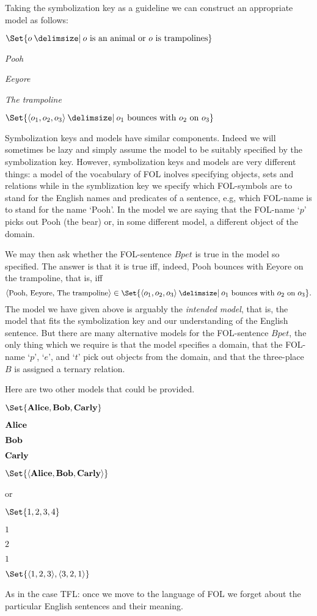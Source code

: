 Taking the symbolization key as a guideline we can construct an appropriate model as follows:
\begin{interp}
\item[\domain]$\Set{o \given o\text{ is an animal or }o\text{ is trampolines}}$
\item[\denote{p}]\emph{Pooh}
\item[\denote{e}]\emph{Eeyore}
\item[\denote{t}]\emph{The trampoline}
\item[\denote{B}]$\Set{\langle o_1,o_2,o_3\rangle \given o_1\text{ bounces with }o_2\text{ on }o_3}$
\end{interp}
Symbolization keys and models have similar components. Indeed we will sometimes be lazy and simply assume the model to be suitably specified by the symbolization key. However, symbolization keys and models are very different things: a model of the vocabulary of FOL inolves specifying objects, sets and relations while in the symblization key we specify which FOL-symbols are to stand for the English names and predicates of a sentence, e.g, which FOL-name is to stand for the name `Pooh'. In the model we are saying that the FOL-name `$p$' picks out Pooh (the bear) or, in some different model, a different object of the domain. 

We may then ask whether the FOL-sentence $Bpet$ is true in the model so specified. The answer is that it is true iff, indeed, Pooh bounces with Eeyore on the trampoline, that is, iff
$${\small \langle \text{Pooh, Eeyore, The trampoline}\rangle\in\Set{\langle o_1,o_2,o_3\rangle \given o_1\text{ bounces with }o_2\text{ on }o_3}.}$$
The model we have given above is arguably the \emph{intended model}, that is, the model that fits the symbolization key and our understanding of the English sentence. But there are many alternative models for the FOL-sentence $Bpet$, the only thing which we require is that the model specifies a domain, that the FOL-name `$p$', `$e$', and `$t$' pick out objects from the domain, and that the three-place $B$ is assigned a ternary relation. 

Here are two other models that could be provided.
\begin{interp}
	\item[\domain]$\Set{\emph{Alice},\emph{Bob}, \emph{Carly}}$
	\item[\denote{p}]$\emph{Alice}$
	\item[\denote{e}]$\emph{Bob}$
	\item[\denote{t}]$\emph{Carly}$
	\item[\denote{B}]$\Set{\sequence{\emph{Alice},\emph{Bob},\emph{Carly}}}$
\end{interp}
or
\begin{interp}
	\item[\domain]$\Set{1,2,3,4}$
	\item[\denote{p}]$1$
	\item[\denote{e}]$2$
	\item[\denote{t}]$1$
	\item[\denote{B}]$\Set{\sequence{1,2,3},\sequence{3,2,1}}$
\end{interp}
As in the case TFL: once we move to the language of FOL we forget about the particular English sentences and their meaning.



